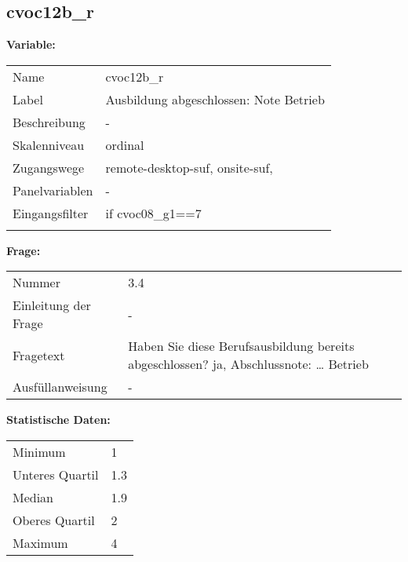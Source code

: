 	
	
	\subsection{cvoc12b\_r}
	\label{subSection:cvoc12b_r}

	\noindent\textbf{Variable:}\\
		\begin{tabular}{lL{11.3cm}}
			\label{tableVariable:cvoc12b_r}
			Name & cvoc12b\_r \\
			Label & Ausbildung abgeschlossen: Note Betrieb \\
			Beschreibung & - \\
			Skalenniveau & ordinal \\
			Zugangswege &
				remote-desktop-suf,
				onsite-suf,
 \\
			Panelvariablen & -
			 \\
			Eingangsfilter & if cvoc08\_g1==7 \\
 \\
		\end{tabular}

		\vspace*{1 cm}
		\noindent\textbf{Frage:}\\
		\begin{tabular}{lL{11.3cm}}
			\label{tableQuestion:cvoc12b_r}
			Nummer & 3.4 \\
			Einleitung der Frage & - \\
			Fragetext & Haben Sie diese Berufsausbildung bereits abgeschlossen?
ja,
Abschlussnote:
… Betrieb \\
			Ausfüllanweisung & - \\
		\end{tabular}


		\vspace*{1 cm}
		\noindent\textbf{Statistische Daten:}\\
			\begin{tabular}{ll}
				\label{tableStatistics:cvoc12b_r}
					Minimum & 1 \\
					Unteres Quartil & 1.3 \\
					Median & 1.9 \\
					Oberes Quartil & 2 \\
					Maximum & 4 \\
			\end{tabular}



